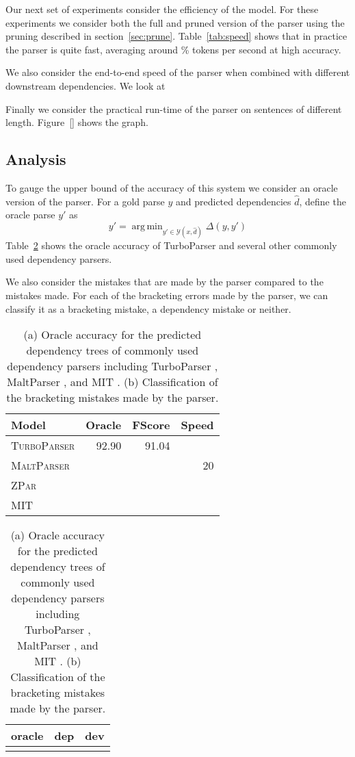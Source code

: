 \documentclass[11pt,letterpaper]{article}
\DeclareMathOperator*{\argmin}{arg\,min}
\begin{document}
Our next set of experiments consider the efficiency of the model. For these experiments we consider both the full and pruned version of the parser using the pruning described in section~\ref{sec:prune}. Table~\ref{tab:speed} shows that in practice the parser is quite fast,  averaging around \% tokens per second at high accuracy.

We also consider the end-to-end speed of the parser when combined with different downstream dependencies. We look at

Finally we consider the practical run-time of the parser on sentences of different length. Figure~\ref{} shows the graph.


\subsection{Analysis}
\label{sec:analysis}

To gauge the upper bound of the accuracy of this system we consider an oracle version of the parser. For a gold parse $y$ and predicted dependencies $\hat{d}$,  define the oracle parse $y'$ as
\[ y' = \argmin_{y' \in \mathcal{Y}(x, \hat{d})} \Delta(y, y') \]
\noindent Table~\ref{tab:oracle} shows the oracle accuracy of TurboParser and several other commonly used dependency parsers.

We also consider the mistakes that are made by the parser compared to the
mistakes made. For each of the bracketing errors made by the parser, we can classify it as a bracketing mistake, a dependency mistake or neither.


\begin{table}
  \centering
  \small

  \begin{tabular}{|l|rrr|}
    \hline
    Model & Oracle & FScore & Speed  \\
    \hline

    \hline
    \textsc{TurboParser} & 92.90 & 91.04 & \\
    \textsc{MaltParser}  & & & 20 \\
    \textsc{ZPar}        & & & \\
    \textsc{MIT}         & & & \\
    \hline
  \end{tabular}

  \vspace{0.5cm}

  \begin{tabular}{|lll|}
    \hline
     oracle & dep & dev  \\
    \hline

    \hline
    & & \\
    \hline
  \end{tabular}
  \label{tab:oracle}
  \caption{(a) Oracle accuracy for the predicted dependency trees of commonly used dependency parsers including TurboParser \cite{martins2013turning}, MaltParser \cite{nivre2006maltparser}, and MIT \cite{}. (b) Classification of the bracketing mistakes made by the parser. }
\end{table}
\end{document}
